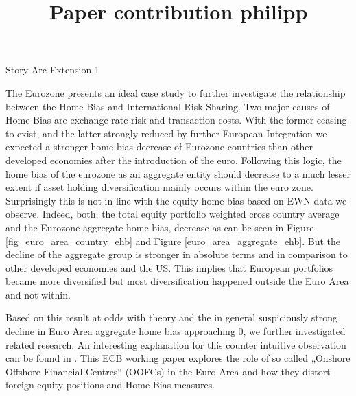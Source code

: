 \documentclass{article}
\title{Paper contribution philipp}
\begin{document}
\maketitle






Story Arc Extension 1

The Eurozone presents an ideal case study to further investigate the relationship between the Home Bias and International Risk Sharing. Two major causes of Home Bias are exchange rate risk and transaction costs. With the former ceasing to exist, and the latter strongly reduced by further European Integration we expected a stronger home bias decrease of Eurozone countries than other developed economies after the introduction of the euro. Following this logic, the home bias of the eurozone as an aggregate entity should decrease to a much lesser extent if asset holding diversification mainly occurs within the euro zone.
Surprisingly this is not in line with the equity home bias based on EWN data we observe. Indeed, both, the total equity portfolio weighted cross country average and the Eurozone aggregate home bias, decrease as can be seen in Figure \ref{fig_euro_area_country_ehb} and Figure \ref{euro_area_aggregate_ehb}. But the decline of the aggregate group is stronger in absolute terms and in comparison to other developed economies and the US. This implies that European portfolios became more diversified but most diversification happened outside the Euro Area and not within.

Based on this result at odds with theory and the in general suspiciously strong decline in Euro Area aggregate home bias approaching 0, we further investigated related research. An interesting explanation for this counter intuitive observation can be found in \textcite{NBER32275}. This ECB working paper explores the role of so called „Onshore Offshore Financial Centres“ (OOFCs) in the Euro Area and how they distort foreign equity positions and Home Bias measures. 
\end{document}
